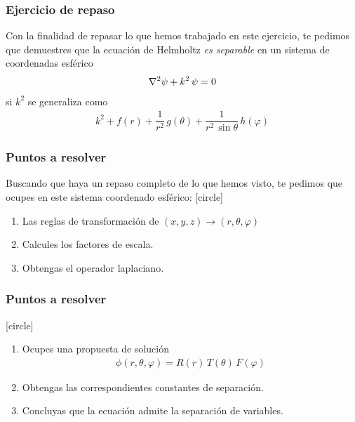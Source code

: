 \documentclass[12pt]{beamer}
\begin{document}
\begin{frame}
\frametitle{Ejercicio de repaso}
Con la finalidad de repasar lo que hemos trabajado en este ejercicio, te pedimos que demuestres que la ecuación de Helmholtz \emph{es separable} en un sistema de coordenadas esférico
\begin{align*}
\laplacian{\psi} + k^{2} \, \psi = 0
\end{align*}
si $k^{2}$ se generaliza como
\begin{align*}
k^{2} + f(r) + \dfrac{1}{r^{2}} \, g(\theta) + \dfrac{1}{r^{2} \, \sin \theta} \, h(\varphi)
\end{align*}
\end{frame}
\begin{frame}
\frametitle{Puntos a resolver}
Buscando que haya un repaso completo de lo que hemos visto, te pedimos que ocupes en este sistema coordenado esférico:
[circle]
\begin{enumerate}[<+->]
\item Las reglas de transformación de $(x, y, z) \to (r, \theta, \varphi)$
\item Calcules los factores de escala.
\item Obtengas el operador laplaciano.
\seti
\end{enumerate}
\end{frame}
\begin{frame}
\frametitle{Puntos a resolver}
[circle]
\begin{enumerate}[<+->]
\conti    
\item Ocupes una propuesta de solución
\begin{align*}
\phi(r, \theta, \varphi) = R(r)\, T(\theta) \, F(\varphi)
\end{align*}
\item Obtengas las correspondientes constantes de separación.
\item Concluyas que la ecuación admite la separación de variables.
\end{enumerate}
\end{frame}
\end{document}
